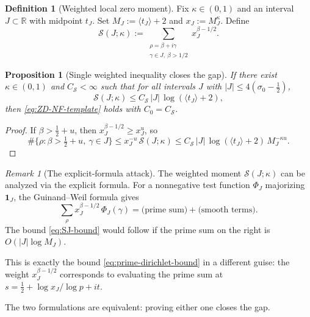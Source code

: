 \documentclass[11pt]{article}
\newtheorem{proposition}[theorem]{Proposition}
\theoremstyle{definition}
\newtheorem{definition}[theorem]{Definition}
\theoremstyle{remark}
\newtheorem{remark}[theorem]{Remark}
\theoremstyle{definition}
\begin{document}
\begin{definition}[Weighted local zero moment]\label{def:weighted-local-moment}
Fix $\kappa \in (0,1)$ and an interval $J \subset \mathbb{R}$ with midpoint $t_J$. Set $M_J := \langle t_J \rangle + 2$ and $x_J := M_J^\kappa$. Define
\[
  \mathcal{S}(J; \kappa) := \sum_{\substack{\rho = \beta + i\gamma \\ \gamma \in J,\ \beta > 1/2}} x_J^{\beta - 1/2}.
\]
\end{definition}

\begin{proposition}[Single weighted inequality closes the gap]\label{prop:SJ-to-ZD}
If there exist $\kappa \in (0,1)$ and $C_{\mathcal{S}} < \infty$ such that for all intervals $J$ with $|J| \le 4(\sigma_0 - \tfrac{1}{2})$,
\begin{equation}\label{eq:SJ-bound}
  \mathcal{S}(J; \kappa) \le C_{\mathcal{S}}\,|J|\,\log(\langle t_J \rangle + 2),
\end{equation}
then \eqref{eq:ZD-NF-template} holds with $C_0 = C_{\mathcal{S}}$.
\end{proposition}
\begin{proof}
If $\beta > \tfrac{1}{2} + u$, then $x_J^{\beta - 1/2} \ge x_J^u$, so
\[
  \#\{\rho : \beta > \tfrac{1}{2} + u,\ \gamma \in J\} \le x_J^{-u}\,\mathcal{S}(J; \kappa)
  \le C_{\mathcal{S}}\,|J|\,\log(\langle t_J \rangle + 2)\,M_J^{-\kappa u}.
\]
\end{proof}

\begin{remark}[The explicit-formula attack]\label{rem:explicit-formula-attack}
The weighted moment $\mathcal{S}(J; \kappa)$ can be analyzed via the explicit formula. For a nonnegative test function $\Phi_J$ majorizing $\mathbf{1}_J$, the Guinand--Weil formula gives
\[
  \sum_\rho x_J^{\beta - 1/2}\,\Phi_J(\gamma) = \text{(prime sum)} + \text{(smooth terms)}.
\]
The bound \eqref{eq:SJ-bound} would follow if the prime sum on the right is $O(|J|\log M_J)$.

This is exactly the bound \eqref{eq:prime-dirichlet-bound} in a different guise: the weight $x_J^{\beta - 1/2}$ corresponds to evaluating the prime sum at $s = \tfrac{1}{2} + \log x_J / \log p + it$.

The two formulations are equivalent: proving either one closes the gap.
\end{remark}
\end{document}
